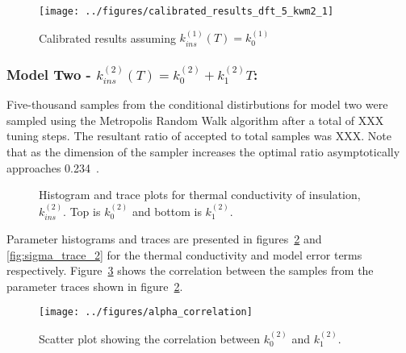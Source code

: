 \documentclass[article]{proc}
\begin{document}
        \begin{figure}[!]
            \centering
            \texttt{[image: ../figures/calibrated\_results\_dft\_5\_kwm2\_1]}
            \caption{Calibrated results assuming $k^{(1)}_{ins}(T) = k^{(1)}_0$}
            \label{fig:cal_results_1}
        \end{figure}

        \subsubsection{Model Two - $k^{(2)}_{ins}(T) = k^{(2)}_0 + k^{(2)}_1 T$:}

        Five-thousand samples from the conditional distirbutions for model two were sampled using the Metropolis Random Walk algorithm after a total of XXX tuning steps. The resultant ratio of accepted to total samples was XXX. Note that as the dimension of the sampler increases the optimal ratio asymptotically approaches 0.234~\cite{Roberts:1997}. 

        \begin{figure}[b!]
            \centering
            \qquad

            \qquad
            \caption{Histogram and trace plots for thermal conductivity of insulation, $k^{(2)}_{ins}$. Top is $k^{(2)}_0$ and bottom is $k^{(2)}_1$.}
            \label{fig:param_trace_2}
        \end{figure}

        Parameter histograms and traces are presented in figures~\ref{fig:param_trace_2} and \ref{fig:sigma_trace_2} for the thermal conductivity and model error terms respectively. Figure~\ref{fig:alpha_correlation} shows the correlation between the samples from the parameter traces shown in figure~\ref{fig:param_trace_2}. 

        \begin{figure}[h!]
            \centering
            \texttt{[image: ../figures/alpha\_correlation]}
            \caption{Scatter plot showing the correlation between $k^{(2)}_0$ and $k^{(2)}_1$.}
            \label{fig:alpha_correlation}
        \end{figure}
\end{document}
